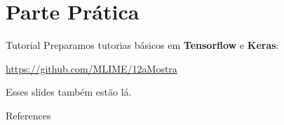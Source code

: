 \documentclass[10pt]{beamer}
\begin{document}
\section{Parte Prática}

\begin{frame}{Tutorial}
Preparamos tutorias básicos em \textbf{Tensorflow} e \textbf{Keras}:
\vspace{0.3cm}
\begin{center}
\url{https://github.com/MLIME/12aMostra}
\end{center}

\vspace{0.3cm}

\alert{Esses slides também estão lá.}

\end{frame}

\begin{frame}[allowframebreaks]{References}

  
  

\end{frame}
\end{document}
